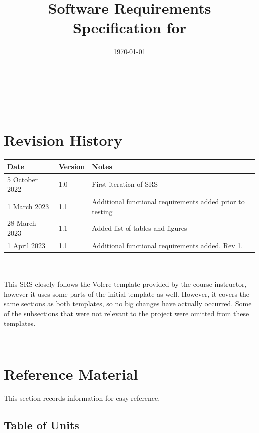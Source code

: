 \documentclass[12pt]{article}
\begin{document}
\title{Software Requirements Specification for \progname} 
\author{\authname}
\date{\today}
	
\maketitle

~\newpage


\tableofcontents

\listoftables %

\listoffigures

~\newpage

\section*{Revision History}

\begin{tabularx}{\textwidth}{p{3cm}p{2cm}X}
\toprule {\bf Date} & {\bf Version} & {\bf Notes}\\
\midrule
5 October 2022 & 1.0 & First iteration of SRS\\
1 March 2023 & 1.1 & Additional functional requirements added prior to testing\\
28 March 2023 & 1.1 & Added list of tables and figures\\
1 April 2023 & 1.1 & Additional functional requirements added. Rev 1.\\
\bottomrule
\end{tabularx}
\\\\
This SRS closely follows the Volere template provided by the course instructor, however it uses some parts of the initial template as well. However, it covers the same sections as both templates, so no big changes have actually occurred. Some of the subsections that were not relevant to the project were omitted from these templates.

~\newpage

\section{Reference Material}

This section records information for easy reference.

\subsection{Table of Units}
\end{document}
